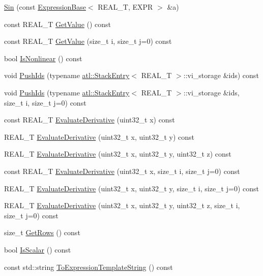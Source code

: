\begin{DoxyCompactItemize}
\item 
\hyperlink{structatl_1_1_sin_a3df17d8ff481eb5f7f28124f4679f57a}{Sin} (const \hyperlink{structatl_1_1_expression_base}{Expression\+Base}$<$ R\+E\+A\+L\+\_\+\+T, E\+X\+P\+R $>$ \&a)
\item 
const R\+E\+A\+L\+\_\+\+T \hyperlink{structatl_1_1_sin_a33dcd22967cf5fcbfc6b4ee03ba577da}{Get\+Value} () const 
\item 
const R\+E\+A\+L\+\_\+\+T \hyperlink{structatl_1_1_sin_aaed0fa6931d8bbdcf99a9fd90ad39762}{Get\+Value} (size\+\_\+t i, size\+\_\+t j=0) const 
\item 
bool \hyperlink{structatl_1_1_sin_a4b25a7cddd6215a986983f350bbe1c78}{Is\+Nonlinear} () const 
\item 
void \hyperlink{structatl_1_1_sin_aa56f96071ecd7ca0deb76bfec206121a}{Push\+Ids} (typename \hyperlink{structatl_1_1_stack_entry}{atl\+::\+Stack\+Entry}$<$ R\+E\+A\+L\+\_\+\+T $>$\+::vi\+\_\+storage \&ids) const 
\item 
void \hyperlink{structatl_1_1_sin_ae8a1e5a0999a8482c13e94aada70ffa8}{Push\+Ids} (typename \hyperlink{structatl_1_1_stack_entry}{atl\+::\+Stack\+Entry}$<$ R\+E\+A\+L\+\_\+\+T $>$\+::vi\+\_\+storage \&ids, size\+\_\+t i, size\+\_\+t j=0) const 
\item 
const R\+E\+A\+L\+\_\+\+T \hyperlink{structatl_1_1_sin_a45ce01d1f6f20dc03a8bcc38ace4bbfd}{Evaluate\+Derivative} (uint32\+\_\+t x) const 
\item 
R\+E\+A\+L\+\_\+\+T \hyperlink{structatl_1_1_sin_a5c0eb6f6ed68d7d204acfac19ddb89b7}{Evaluate\+Derivative} (uint32\+\_\+t x, uint32\+\_\+t y) const 
\item 
R\+E\+A\+L\+\_\+\+T \hyperlink{structatl_1_1_sin_ac050a241fa8fab93a53c51c036472554}{Evaluate\+Derivative} (uint32\+\_\+t x, uint32\+\_\+t y, uint32\+\_\+t z) const 
\item 
const R\+E\+A\+L\+\_\+\+T \hyperlink{structatl_1_1_sin_aff3bd97670bbc85fbde6fc0ae230f848}{Evaluate\+Derivative} (uint32\+\_\+t x, size\+\_\+t i, size\+\_\+t j=0) const 
\item 
R\+E\+A\+L\+\_\+\+T \hyperlink{structatl_1_1_sin_ac2df0e957a446956538a99e625371063}{Evaluate\+Derivative} (uint32\+\_\+t x, uint32\+\_\+t y, size\+\_\+t i, size\+\_\+t j=0) const 
\item 
R\+E\+A\+L\+\_\+\+T \hyperlink{structatl_1_1_sin_adee924b42b7927a6ba8e272735c79a65}{Evaluate\+Derivative} (uint32\+\_\+t x, uint32\+\_\+t y, uint32\+\_\+t z, size\+\_\+t i, size\+\_\+t j=0) const 
\item 
size\+\_\+t \hyperlink{structatl_1_1_sin_a7e4fc8f849125a5e048772b1849655e1}{Get\+Rows} () const 
\item 
bool \hyperlink{structatl_1_1_sin_a7d9afdaaefe56e146b96a4945ff2bcbe}{Is\+Scalar} () const 
\item 
const std\+::string \hyperlink{structatl_1_1_sin_ae9305f44533e915d6d7a9e24aa6d6fd5}{To\+Expression\+Template\+String} () const 
\end{DoxyCompactItemize}
